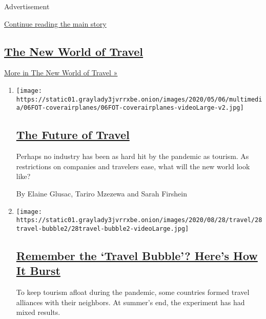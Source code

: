 Advertisement

\protect\hyperlink{after-mid1}{Continue reading the main story}

\hypertarget{the-new-world-of-travel}{%
\subsection{\texorpdfstring{\href{/spotlight/the-new-world-of-travel}{The
New World of
Travel}}{The New World of Travel}}\label{the-new-world-of-travel}}

\href{/spotlight/the-new-world-of-travel}{More in The New World of
Travel »}

\begin{enumerate}
\def\labelenumi{\arabic{enumi}.}
\item
  \texttt{[image: https://static01.graylady3jvrrxbe.onion/images/2020/05/06/multimedia/06FOT-coverairplanes/06FOT-coverairplanes-videoLarge-v2.jpg]}

  \hypertarget{the-future-of-travel}{%
  \subsection{\texorpdfstring{\href{/interactive/2020/05/06/travel/coronavirus-travel-questions.html}{The
  Future of Travel}}{The Future of Travel}}\label{the-future-of-travel}}

  Perhaps no industry has been as hard hit by the pandemic as tourism.
  As restrictions on companies and travelers ease, what will the new
  world look like?

  By Elaine Glusac, Tariro Mzezewa and Sarah Firshein
\item
  \texttt{[image: https://static01.graylady3jvrrxbe.onion/images/2020/08/28/travel/28travel-bubble2/28travel-bubble2-videoLarge.jpg]}

  \hypertarget{remember-the-travel-bubble-heres-how-it-burst}{%
  \subsection{\texorpdfstring{\href{/2020/08/28/travel/international-travel-bubbles-coronavirus.html}{Remember
  the `Travel Bubble'? Here's How It
  Burst}}{Remember the `Travel Bubble'? Here's How It Burst}}\label{remember-the-travel-bubble-heres-how-it-burst}}

  To keep tourism afloat during the pandemic, some countries formed
  travel alliances with their neighbors. At summer's end, the experiment
  has had mixed results.


\end{enumerate}

